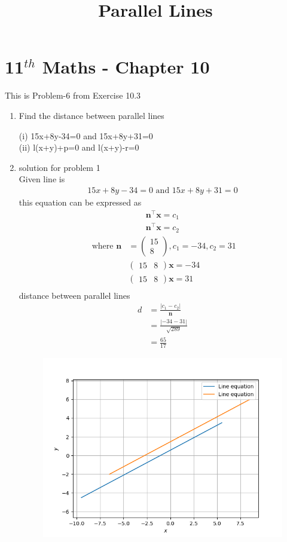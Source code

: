 \documentclass[12pt]{article}
\providecommand{\abs}[1]{\left\vert#1\right\vert}
\newcommand{\myvec}[1]{\ensuremath{\begin{pmatrix}#1\end{pmatrix}}}
\let\vec\mathbf
\begin{document}
\begin{center}
\title{\textbf{Parallel Lines}}
\date{\vspace{-5ex}} %
\maketitle
\end{center}
\setcounter{page}{1}
\section*{11$^{th}$ Maths - Chapter 10}
This is Problem-6 from Exercise 10.3
\begin{enumerate}
	\item Find the distance between parallel lines 
	
(i) 15x+8y-34=0 and  15x+8y+31=0 \\
(ii) l(x+y)+p=0 and  l(x+y)-r=0
\	
\item solution for problem 1
\\
Given line is 
\begin{align}
	15x+8y-34=0\text{ and }15x+8y+31=0
\end{align}
this equation can be expressed as 
\begin{align}
	\vec{n}^{\top}\vec{x}=c_1\\	
	\vec{n}^{\top}\vec{x}=c_2	
\end{align}
\begin{align}
\text{ where }
\vec{n}&=\myvec{15\\8},c_1=-34, c_2= 31\\
& \myvec{15&8}\vec{x}=-34\\ 
& \myvec{15&8}\vec{x}=31\\
\end{align} 
distance between parallel lines 
\begin{align}
d&=\frac{\abs{c_1-c_2}}{\vec{n}}\\
&=\frac{\abs{-34-31}}{\sqrt{289}}\\
&=\frac{65}{17}
\end{align}
\begin{figure}[h!]
\begin{center}
\includegraphics[width=\columnwidth]{para.png}

\end{center}
\end{figure}
\end{enumerate}
\end{document}
